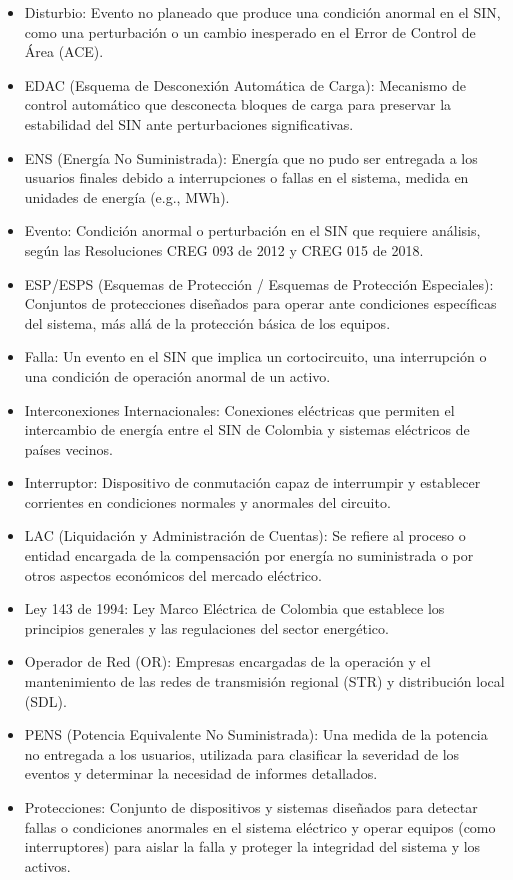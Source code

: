\documentclass[a5paper]{book}%
\begin{document}
{\begin{itemize}
  \item Disturbio: Evento no planeado que produce una condición anormal en el SIN, como una perturbación o un cambio inesperado en el Error de Control de Área (ACE).
  \item EDAC (Esquema de Desconexión Automática de Carga): Mecanismo de control automático que desconecta bloques de carga para preservar la estabilidad del SIN ante perturbaciones significativas.
  \item ENS (Energía No Suministrada): Energía que no pudo ser entregada a los usuarios finales debido a interrupciones o fallas en el sistema, medida en unidades de energía (e.g., MWh).
  \item Evento: Condición anormal o perturbación en el SIN que requiere análisis, según las Resoluciones CREG 093 de 2012 y CREG 015 de 2018.
  \item ESP/ESPS (Esquemas de Protección / Esquemas de Protección Especiales): Conjuntos de protecciones diseñados para operar ante condiciones específicas del sistema, más allá de la protección básica de los equipos.
  \item Falla: Un evento en el SIN que implica un cortocircuito, una interrupción o una condición de operación anormal de un activo.
  \item Interconexiones Internacionales: Conexiones eléctricas que permiten el intercambio de energía entre el SIN de Colombia y sistemas eléctricos de países vecinos.
  \item Interruptor: Dispositivo de conmutación capaz de interrumpir y establecer corrientes en condiciones normales y anormales del circuito.
  \item LAC (Liquidación y Administración de Cuentas): Se refiere al proceso o entidad encargada de la compensación por energía no suministrada o por otros aspectos económicos del mercado eléctrico.
  \item Ley 143 de 1994: Ley Marco Eléctrica de Colombia que establece los principios generales y las regulaciones del sector energético.
  \item Operador de Red (OR): Empresas encargadas de la operación y el mantenimiento de las redes de transmisión regional (STR) y distribución local (SDL).
  \item PENS (Potencia Equivalente No Suministrada): Una medida de la potencia no entregada a los usuarios, utilizada para clasificar la severidad de los eventos y determinar la necesidad de informes detallados.
  \item Protecciones: Conjunto de dispositivos y sistemas diseñados para detectar fallas o condiciones anormales en el sistema eléctrico y operar equipos (como interruptores) para aislar la falla y proteger la integridad del sistema y los activos.

\end{itemize}}
\end{document}
